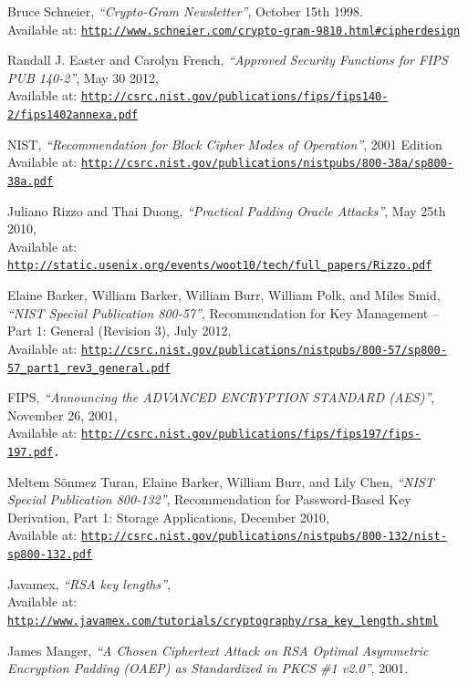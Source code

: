 \documentclass[12pt, titlepage]{article}
\begin{document}
\begin{thebibliography}{10}
Bruce Schneier, \emph{``Crypto-Gram Newsletter''}, October 15th 1998.
\\ Available at: \texttt{\url{http://www.schneier.com/crypto-gram-9810.html\#cipherdesign}}

Randall J. Easter and Carolyn French, \emph{``Approved Security Functions
for FIPS PUB 140-2''}, May 30 2012,
\\ Available at: \texttt{\url{http://csrc.nist.gov/publications/fips/fips140-2/fips1402annexa.pdf}}

NIST, \emph{``Recommendation for Block Cipher Modes of Operation''}, 2001 Edition
\\ Available at: \texttt{\url{http://csrc.nist.gov/publications/nistpubs/800-38a/sp800-38a.pdf}}

Juliano Rizzo and Thai Duong, \emph{``Practical Padding Oracle Attacks''}, May 25th 2010,
\\ Available at: \texttt{\url{http://static.usenix.org/events/woot10/tech/full_papers/Rizzo.pdf}}

Elaine Barker, William Barker, William Burr, William Polk, and Miles Smid, \emph{``NIST Special Publication 800-57''}, Recommendation for Key Management – Part 1: General (Revision 3), July
2012,
\\ Available at: \texttt{\url{http://csrc.nist.gov/publications/nistpubs/800-57/sp800-57_part1_rev3_general.pdf}}

FIPS, \emph{``Announcing the ADVANCED ENCRYPTION STANDARD (AES)''}, November 26, 2001,
\\ Available at:
\texttt{\url{http://csrc.nist.gov/publications/fips/fips197/fips-197.pdf}.}

Meltem Sönmez Turan, Elaine Barker, William Burr, and Lily Chen, \emph{``NIST Special Publication 800-132''}, Recommendation for Password-Based Key Derivation, Part 1: Storage Applications, December 2010,
\\ Available at: \texttt{\url{http://csrc.nist.gov/publications/nistpubs/800-132/nist-sp800-132.pdf}}

Javamex, \emph{``RSA key lengths''},
\\ Available at: \texttt{\url{http://www.javamex.com/tutorials/cryptography/rsa_key_length.shtml}}

James Manger, \emph{``A Chosen Ciphertext Attack on RSA Optimal Asymmetric Encryption Padding (OAEP) as Standardized in PKCS \#1 v2.0''}, 2001.


\end{thebibliography}
\end{document}

